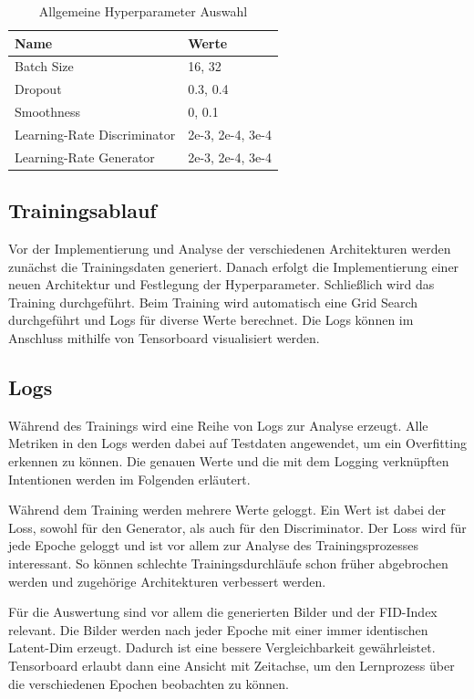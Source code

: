 \begin{table}[H]
	\centering
	\label{table:hyperparameter}
	\begin{tabular}{l l}
		Name                        & Werte            \\ \hline
		Batch Size                  & 16, 32           \\
		Dropout                     & 0.3, 0.4         \\
		Smoothness                  & 0, 0.1           \\
		Learning-Rate Discriminator & 2e-3, 2e-4, 3e-4 \\
		Learning-Rate Generator     & 2e-3, 2e-4, 3e-4
	\end{tabular}
	\caption{Allgemeine Hyperparameter Auswahl}
\end{table}

\subsection{Trainingsablauf}
Vor der Implementierung und Analyse der verschiedenen Architekturen werden zunächst die Trainingsdaten generiert.
Danach erfolgt die Implementierung einer neuen Architektur und Festlegung der Hyperparameter.
Schließlich wird das Training durchgeführt.
Beim Training wird automatisch eine Grid Search durchgeführt und Logs für diverse Werte berechnet.
Die Logs können im Anschluss mithilfe von Tensorboard visualisiert werden.

\subsection{Logs}
Während des Trainings wird eine Reihe von Logs zur Analyse erzeugt.
Alle Metriken in den Logs werden dabei auf Testdaten angewendet, um ein Overfitting erkennen zu können.
Die genauen Werte und die mit dem Logging verknüpften Intentionen werden im Folgenden erläutert.
\newline

Während dem Training werden mehrere Werte geloggt.
Ein Wert ist dabei der Loss, sowohl für den Generator, als auch für den Discriminator.
Der Loss wird für jede Epoche geloggt und ist vor allem zur Analyse des Trainingsprozesses interessant.
So können schlechte Trainingsdurchläufe schon früher abgebrochen werden und zugehörige Architekturen verbessert werden.
\newline

Für die Auswertung sind vor allem die generierten Bilder und der \acrshort{FID}-Index relevant.
Die Bilder werden nach jeder Epoche mit einer immer identischen Latent-Dim erzeugt.
Dadurch ist eine bessere Vergleichbarkeit gewährleistet.
Tensorboard erlaubt dann eine Ansicht mit Zeitachse, um den Lernprozess über die verschiedenen Epochen beobachten zu können.
\newline

